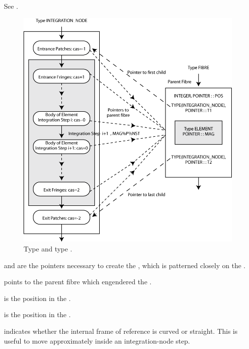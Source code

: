 See .

\begin{figure}[ht]\forcerectofloat
  \centering
  \includegraphics[width=\textwidth]{illustrations/integration-node-and-fibre}
  \caption{Type  and type .}
  \label{fig:TYPE-INTEGRATION_NODE}
\end{figure}

 and  are the pointers necessary to create the ,
which is patterned closely on the .

 points to the parent fibre which engendered the 
.

 is the position in the .

 is the position in the .

 indicates whether the internal frame of reference is
curved or straight. This is useful to move approximately inside an integration-node
step.

